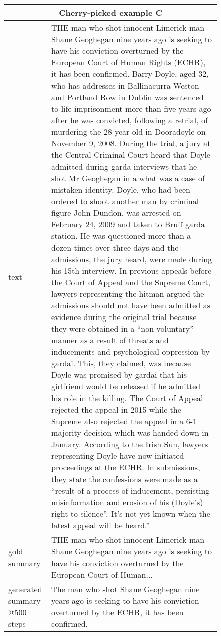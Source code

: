 \documentclass[11pt,a4paper]{article}
\begin{document}
    \clearpage
\begin{figure*}[t]
    \centering
    \begin{adjustbox}{width=\textwidth}
    \begin{tabular}{|p{}|p{}|}
    \hline
    \multicolumn{2}{|c|}{\textbf{Cherry-picked example C}} \\
    \hline
    text & THE man who shot innocent Limerick man Shane Geoghegan nine years ago is seeking to have his conviction overturned by the European Court of Human Rights (ECHR), it has been confirmed. Barry Doyle, aged 32, who has addresses in Ballinacurra Weston and Portland Row in Dublin was sentenced to life imprisonment more than five years ago after he was convicted, following a retrial, of murdering the 28-year-old in Dooradoyle on November 9, 2008. During the trial, a jury at the Central Criminal Court heard that Doyle admitted during garda interviews that he shot Mr Geoghegan in a what was a case of mistaken identity. Doyle, who had been ordered to shoot another man by criminal figure John Dundon, was arrested on February 24, 2009 and taken to Bruff garda station. He was questioned more than a dozen times over three days and the admissions, the jury heard, were made during his 15th interview. In previous appeals before the Court of Appeal and the Supreme Court, lawyers representing the hitman argued the admissions should not have been admitted as evidence during the original trial because they were obtained in a “non-voluntary” manner as a result of threats and inducements and psychological oppression by gardai. This, they claimed, was because Doyle was promised by gardai that his girlfriend would be released if he admitted his role in the killing. The Court of Appeal rejected the appeal in 2015 while the Supreme also rejected the appeal in a 6-1 majority decision which was handed down in January. According to the Irish Sun, lawyers representing Doyle have now initiated proceedings at the ECHR. In submissions, they state the confessions were made as a “result of a process of inducement, persisting misinformation and erosion of his (Doyle’s) right to silence”. It’s not yet known when the latest appeal will be heard.”\\
    \hline
    gold summary & 	
    THE man who shot innocent Limerick man Shane Geoghegan nine years ago is seeking to have his conviction overturned by the European Court of Human... \\
    \hline
    generated summary @500 steps & The man who shot Shane Geoghegan nine years ago is seeking to have his conviction overturned by the ECHR, it has been confirmed.\\

\end{tabular}
\end{adjustbox}
\end{figure*}
\end{document}
